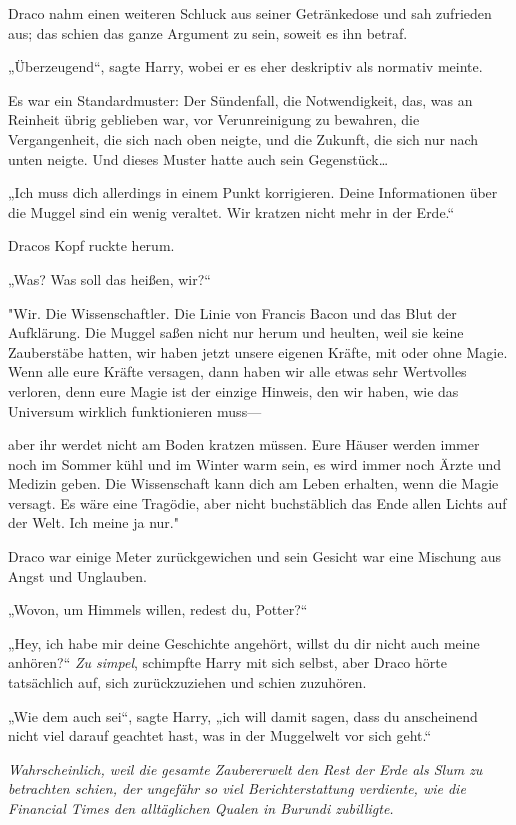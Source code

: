 {Draco nahm einen weiteren Schluck aus seiner Getränkedose und sah zufrieden aus; das schien das ganze Argument zu sein, soweit es ihn betraf.

„Überzeugend“, sagte Harry, wobei er es eher deskriptiv als normativ meinte.

Es war ein Standardmuster: Der Sündenfall, die Notwendigkeit, das, was an Reinheit übrig geblieben war, vor Verunreinigung zu bewahren, die Vergangenheit, die sich nach oben neigte, und die Zukunft, die sich nur nach unten neigte. Und dieses Muster hatte auch sein Gegenstück…

„Ich muss dich allerdings in einem Punkt korrigieren. Deine Informationen über die Muggel sind ein wenig veraltet. Wir kratzen nicht mehr in der Erde.“

Dracos Kopf ruckte herum.

„Was? Was soll das heißen, wir?“

"Wir. Die Wissenschaftler. Die Linie von Francis Bacon und das Blut der Aufklärung. Die Muggel saßen nicht nur herum und heulten, weil sie keine Zauberstäbe hatten, wir haben jetzt unsere eigenen Kräfte, mit oder ohne Magie. Wenn alle eure Kräfte versagen, dann haben wir alle etwas sehr Wertvolles verloren, denn eure Magie ist der einzige Hinweis, den wir haben, wie das Universum wirklich funktionieren muss—

aber ihr werdet nicht am Boden kratzen müssen. Eure Häuser werden immer noch im Sommer kühl und im Winter warm sein, es wird immer noch Ärzte und Medizin geben. Die Wissenschaft kann dich am Leben erhalten, wenn die Magie versagt. Es wäre eine Tragödie, aber nicht buchstäblich das Ende allen Lichts auf der Welt. Ich meine ja nur."

Draco war einige Meter zurückgewichen und sein Gesicht war eine Mischung aus Angst und Unglauben.

„Wovon, um Himmels willen, redest du, Potter?“

„Hey, ich habe mir deine Geschichte angehört, willst du dir nicht auch meine anhören?“ \emph{Zu simpel}, schimpfte Harry mit sich selbst, aber Draco hörte tatsächlich auf, sich zurückzuziehen und schien zuzuhören.

„Wie dem auch sei“, sagte Harry, „ich will damit sagen, dass du anscheinend nicht viel darauf geachtet hast, was in der Muggelwelt vor sich geht.“

\emph{Wahrscheinlich, weil die gesamte Zaubererwelt den Rest der Erde als Slum zu betrachten schien, der ungefähr so viel Berichterstattung verdiente, wie die Financial Times den alltäglichen Qualen in Burundi zubilligte.}

}
